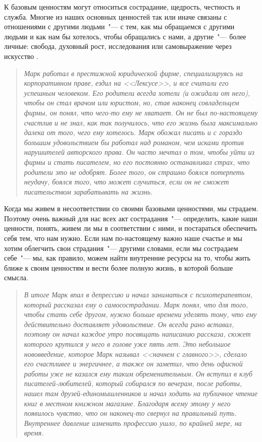 К базовым ценностям могут относиться сострадание, щедрость, честность и служба. Многие из наших основных ценностей так или иначе связаны с отношениями с другими людьми~"--- с тем, как мы обращаемся с другими людьми и как нам бы хотелось, чтобы обращались с нами, а другие~"---  более личные: свобода, духовный рост, исследования или самовыражение через искусство \cite{83}. 

\begin{quotation}
	\textit{
		Марк работал в престижной юридической фирме, специализируясь на корпоративном праве, ездил на <<Лексусе>>, и все считали его успешным человеком. Его родители всегда хотели (и ожидали от него), чтобы он стал врачом или юристом, но, став наконец совладельцем фирмы, он понял, что чего-то ему не хватает.  Он не был по-настоящему счастлив и не знал, как так получилось, что его жизнь была максимально далека от того, чего ему хотелось. Марк обожал писать и с гораздо большим удовольствием бы работал над романом, чем исками против нарушителей авторского права.  Он часто мечтал о том, чтобы уйти из фирмы и стать писателем, но его постоянно останавливал страх, что родители это не одобрят. Более того, он страшно боялся потерпеть неудачу, боялся того, что может случиться, если он не сможет писательством зарабатывать на жизнь.
	} 
\end{quotation}

Когда мы живем в несоответствии со своими базовыми ценностями, мы страдаем. Поэтому очень важный для нас всех акт сострадания~"--- определить, какие наши ценности, понять, живем ли мы в соответствии с ними, и постараться обеспечить себя тем, что нам нужно. Если нам по-настоящему важно наше счастье и мы хотим облегчить свои страдания~"--- другими словами, если мы сострадаем себе~"--- мы, как правило, можем найти внутренние ресурсы на то, чтобы жить ближе к своим ценностям и вести более полную жизнь, в которой больше смысла. 

\begin{quotation}
	\textit{
		В итоге Марк впал в депрессию и начал заниматься с психотерапевтом, который рассказал ему о самосострадании. Марк понял, что для того, чтобы стать себе другом, нужно больше времени уделять тому, что ему действительно доставляет удовольствие. Он всегда рано вставал, поэтому он начал каждое утро посвящать написанию рассказа, сюжет которого крутился у него в голове уже пять лет. Это небольшое нововведение, которое Марк называл <<начнем с главного>>, сделало его счастливее и энергичнее, а также он заметил, что день офисной работы уже не казался ему таким обременительным. Он вступил в клуб писателей-любителей, который собирался по вечерам, после работы, нашел там друзей-единомышленников и начал ходить на публичное чтение книг в местном книжном магазине. Благодаря всему этому у него появилось чувство, что он наконец-то свернул на правильный путь. Внутреннее давление изменить профессию ушло, по крайней мере, на время.
	}
\end{quotation}


